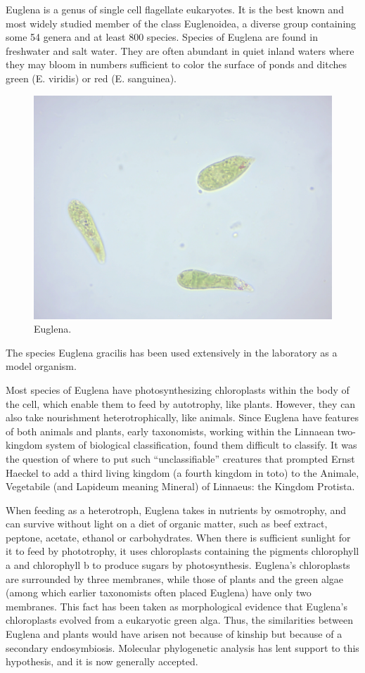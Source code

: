 Euglena is a genus of single cell flagellate eukaryotes. It is the best known and most widely studied member of the class Euglenoidea, a diverse group containing some 54 genera and at least 800 species. Species of Euglena are found in freshwater and salt water. They are often abundant in quiet inland waters where they may bloom in numbers sufficient to color the surface of ponds and ditches green (E. viridis) or red (E. sanguinea).

\begin{figure}

{\centering \includegraphics[width=0.7\linewidth]{./figures/protista/euglena} 

}

\caption{Euglena.}\label{fig:euglena}
\end{figure}

The species Euglena gracilis has been used extensively in the laboratory as a model organism.

Most species of Euglena have photosynthesizing chloroplasts within the body of the cell, which enable them to feed by autotrophy, like plants. However, they can also take nourishment heterotrophically, like animals. Since Euglena have features of both animals and plants, early taxonomists, working within the Linnaean two-kingdom system of biological classification, found them difficult to classify. It was the question of where to put such ``unclassifiable'' creatures that prompted Ernst Haeckel to add a third living kingdom (a fourth kingdom in toto) to the Animale, Vegetabile (and Lapideum meaning Mineral) of Linnaeus: the Kingdom Protista.

When feeding as a heterotroph, Euglena takes in nutrients by osmotrophy, and can survive without light on a diet of organic matter, such as beef extract, peptone, acetate, ethanol or carbohydrates. When there is sufficient sunlight for it to feed by phototrophy, it uses chloroplasts containing the pigments chlorophyll a and chlorophyll b to produce sugars by photosynthesis. Euglena's chloroplasts are surrounded by three membranes, while those of plants and the green algae (among which earlier taxonomists often placed Euglena) have only two membranes. This fact has been taken as morphological evidence that Euglena's chloroplasts evolved from a eukaryotic green alga. Thus, the similarities between Euglena and plants would have arisen not because of kinship but because of a secondary endosymbiosis. Molecular phylogenetic analysis has lent support to this hypothesis, and it is now generally accepted.

